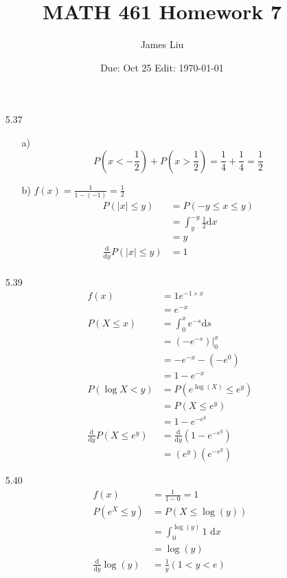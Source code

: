 \documentclass{article}
\date{Due: Oct 25 Edit: \today}
\title{MATH 461 Homework 7}
\author{James Liu}
\begin{document}
\maketitle
\begin{itemize}
    \item [5.37]
    \begin{itemize}
        \item [a)]
        \[P(x<-\frac{1}{2})+P(x>\frac{1}{2})=\frac{1}{4}+\frac{1}{4}=\frac{1}{2}\]
        \item [b)] \(f(x)=\frac{1}{1-(-1)}=\frac{1}{2}\)
        \begin{align*}
            P(|x|\leq y)&=P(-y\leq x \leq y)\\
            &=\int_{y}^{-y}\frac{1}{2}\text{d}x\\
            &=y\\
            \frac{\text{d}}{\text{d}y}P(|x|\leq y)&=1\\
        \end{align*}
    \end{itemize}
    \item [5.39]
    \begin{align*}
        f(x)&=1e^{-1\times x}\\
        &=e^{-x}\\
        P(X\leq x)&=\int_{0}^{x}e^{-s}\text{d}s\\
        &=\left.(-e^{-s})\right|^{x}_{0}\\
        &=-e^{-x}-(-e^0)\\
        &=1-e^{-x}\\
        P(\log{X}<y)&=P(e^{\log(X)}\leq e^y)\\
        &=P(X\leq e^y)\\
        &=1-e^{-e^{y}}\\
        \frac{\text{d}}{\text{d}y} P(X\leq e^y)&=\frac{\text{d}}{\text{d}y} (1-e^{-e^{y}})\\
        &=(e^y)(e^{-e^y})
    \end{align*}
    \newpage
    \item [5.40]
    \begin{align*}
        f(x)&=\frac{1}{1-0}=1\\
        P(e^X\leq y)&= P(X\leq \log (y))\\
        &=\int_{0}^{\log(y)} 1 \text{ d}x\\
        &=\log(y)\\
        \frac{\text{d}}{\text{d}y} \log(y)&= \frac{1}{y} (1<y<e)
    \end{align*}

\end{itemize}
\end{document}
